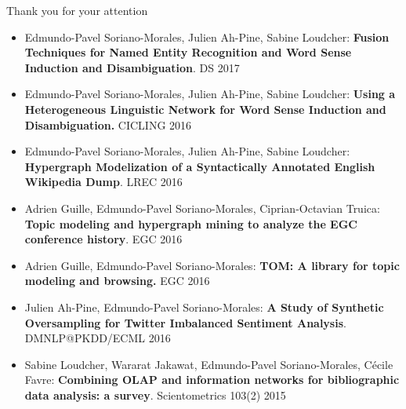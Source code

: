 \documentclass[10pt,=table]{beamer}
\begin{document}
\begin{frame}{\textcolor{greenEric}{Thank you for your attention}}
\begin{itemize}
	\item \footnotesize Edmundo-Pavel Soriano-Morales, Julien Ah-Pine, Sabine Loudcher: \textbf{Fusion Techniques for Named Entity Recognition and Word Sense Induction and Disambiguation}. DS 2017
	\item \footnotesize Edmundo-Pavel Soriano-Morales, Julien Ah-Pine, Sabine Loudcher:
	\textbf{Using a Heterogeneous Linguistic Network for Word Sense Induction and Disambiguation.} CICLING 2016
	\item \footnotesize Edmundo-Pavel Soriano-Morales, Julien Ah-Pine, Sabine Loudcher:
		\textbf{Hypergraph Modelization of a Syntactically Annotated English Wikipedia Dump}. LREC 2016
	\item \footnotesize Adrien Guille, Edmundo-Pavel Soriano-Morales, Ciprian-Octavian Truica:
\textbf{Topic modeling and hypergraph mining to analyze the EGC conference history}. EGC 2016
\item \footnotesize Adrien Guille, Edmundo-Pavel Soriano-Morales:
\textbf{TOM: A library for topic modeling and browsing.} EGC 2016
\item \footnotesize Julien Ah-Pine, Edmundo-Pavel Soriano-Morales: \textbf{A Study of Synthetic Oversampling for Twitter Imbalanced Sentiment Analysis}. DMNLP@PKDD/ECML 2016

\item \footnotesize Sabine Loudcher, Wararat Jakawat, Edmundo-Pavel Soriano-Morales, C\'{e}cile Favre:	\textbf{Combining OLAP and information networks for bibliographic data analysis: a survey}. Scientometrics 103(2) 2015
\end{itemize}
\end{frame}

%


%

	
\end{document}
